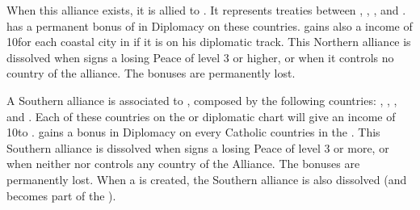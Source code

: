 \begin{digressions}



  \effetlong
  \aparag When this alliance exists, it is allied to \HOLhol.  It represents
  treaties between \paysOldenburg, \paysHanovre, \paysHesse, \paysHanse and
  \paysBerg.
  \aparag \HOL has a permanent bonus of  in Diplomacy on these
  countries.
  \aparag \HOL gains also a income of 10\ducats for each coastal city in
  \paysHanse if it is on his diplomatic track.
  \bparag This Northern alliance is dissolved when \HOL signs a losing Peace
  of level 3 or higher, or when it controls no country of the alliance. The
  bonuses are permanently lost.



  \effetlong
  \aparag A Southern \HRE alliance is associated to \HAB, composed by the
  following countries: \paysBaviere, \paysMayence, \paysAlsace, \paysBade and
  \paysWurtemberg.
  \aparag Each of these countries on the \HAB or \MAJHAB diplomatic chart will
  give an income of 10\ducats to \MAJHAB.
  \aparag \MAJHAB gains a  bonus in Diplomacy on every Catholic
  countries in the \HRE.
  \aparag This Southern alliance is dissolved when \MAJHAB signs a losing
  Peace of level 3 or more, or when neither \MAJHAB nor \HAB controls any
  country of the Alliance.  The bonuses are permanently lost.
  \aparag When a \GE is created, the Southern alliance is also dissolved (and
  becomes part of the \GE).




\end{digressions}
